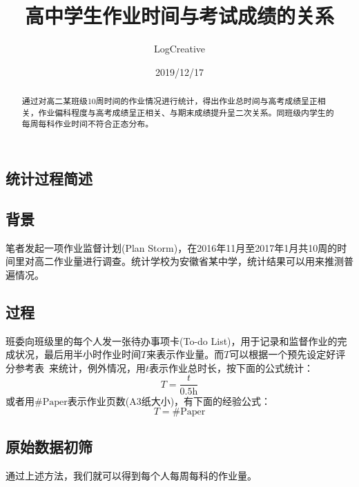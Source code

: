 \documentclass{article}
\begin{document}
\begin{CJK}{UTF8}{song}

\title{高中学生作业时间与考试成绩的关系}

\author[*]{LogCreative}

\date{2019/12/17}

\renewcommand*{\Affilfont}{\small\it} %

\maketitle

\begin{abstract}
通过对高二某班级10周时间的作业情况进行统计，得出作业总时间与高考成绩呈正相关，作业偏科程度与高考成绩呈正相关、与期末成绩提升呈二次关系。同班级内学生的每周每科作业时间不符合正态分布。
\end{abstract}

\section{统计过程简述}
\subsection{背景}
笔者发起一项作业监督计划(Plan Storm)，在2016年11月至2017年1月共10周的时间里对高二作业量进行调查。统计学校为安徽省某中学，统计结果可以用来推测普遍情况。

\subsection{过程}
班委向班级里的每个人发一张待办事项卡(To-do List)，用于记录和监督作业的完成状况，最后用半小时作业时间$T$来表示作业量。而$T$可以根据一个预先设定好评分参考表~\cite[Appendix~A]{}来统计，例外情况，用$t$表示作业总时长，按下面的公式统计：
\begin{equation}\label{1}
  T=\frac{t}{0.5\textrm{h}}
\end{equation}
或者用$\#\textrm{Paper}$表示作业页数(A3纸大小)，有下面的经验公式：
\begin{equation}\label{2}
  T=\#\textrm{Paper}
\end{equation}

\subsection{原始数据初筛}
通过上述方法，我们就可以得到每个人每周每科的作业量。


\end{CJK}
\end{document}
